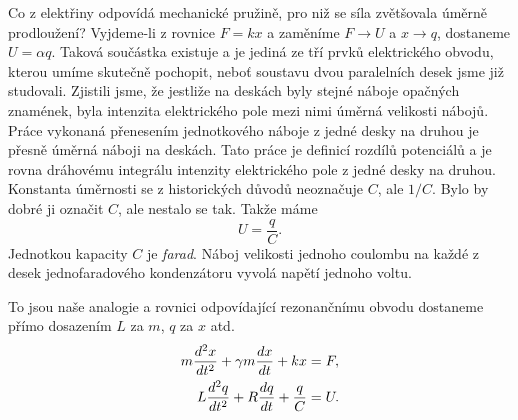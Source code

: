     Co z elektřiny odpovídá mechanické pružině, pro niž se síla zvětšovala úměrně prodloužení? 
    Vyjdeme-li z rovnice \(F=kx\) a zaměníme \(F \rightarrow U\) a \(x \rightarrow q\), dostaneme 
    \(U = \alpha q\). Taková součástka existuje a je jediná ze tří prvků elektrického obvodu, 
    kterou umíme skutečně pochopit, neboť soustavu dvou paralelních desek jsme již studovali. 
    Zjistili jsme, že jestliže na deskách byly stejné náboje opačných znamének, byla intenzita 
    elektrického pole mezi nimi úměrná velikosti nábojů. Práce vykonaná přenesením jednotkového 
    náboje z jedné desky na druhou je přesně úměrná náboji na deskách. Tato práce je definicí 
    rozdílů potenciálů a je rovna dráhovému integrálu intenzity elektrického pole z jedné desky na 
    druhou. Konstanta úměrnosti se z historických důvodů neoznačuje \(C\), ale \(1/C\). Bylo by 
    dobré ji označit \(C\), ale nestalo se tak. Takže máme
    \begin{equation}\label{fyz:eq350}
      U = \frac{q}{C}.
    \end{equation}
    Jednotkou kapacity \(C\) je \emph{farad}. Náboj velikosti jednoho coulombu na každé z desek 
    jednofaradového kondenzátoru vyvolá napětí jednoho voltu.
    
    To jsou naše analogie a rovnici odpovídající rezonančnímu obvodu dostaneme přímo dosazením 
    \(L\) za \(m\), \(q\) za \(x\) atd.
    \begin{subequations}\label{fyz:eq351}
      \begin{align}
        m\dfrac{d^2 x}{d t^2} + \gamma m\dfrac{d x}{d t} + kx   &= F,   \label{fyz:eq351a}   \\
        L\dfrac{d^2 q}{d t^2} + R\dfrac{d q}{d t} + \frac{q}{C} &= U.   \label{fyz:eq351b}
      \end{align}
    \end{subequations}
    
